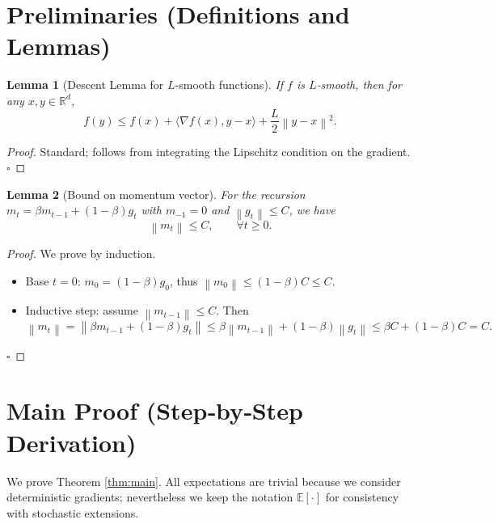 \documentclass{article}
\newtheorem{lemma}{Lemma}
\newcommand{\E}{\mathbb{E}}
\newcommand{\norm}[1]{\left\lVert #1 \right\rVert}
\begin{document}
\newpage
\section*{Preliminaries (Definitions and Lemmas)}
\begin{lemma}[Descent Lemma for $L$‑smooth functions]\label{lem:descent}
If $f$ is $L$‑smooth, then for any $x,y\in\mathbb{R}^d$,
\[
    f(y) \le f(x) + \langle\nabla f(x),y-x\rangle + \frac{L}{2}\norm{y-x}^2 .
\]
\end{lemma}
\begin{proof}
Standard; follows from integrating the Lipschitz condition on the gradient. \hfill $\square$
\end{proof}
\begin{lemma}[Bound on momentum vector]\label{lem:momentum}
For the recursion $m_t=\beta m_{t-1}+(1-\beta)g_t$ with $m_{-1}=0$ and $\norm{g_t}\le C$, we have
\[
    \norm{m_t}\le C,\qquad\forall t\ge0 .
\]
\end{lemma}
\begin{proof}
We prove by induction.
\begin{itemize}
    \item Base $t=0$: $m_0=(1-\beta)g_0$, thus $\norm{m_0}\le (1-\beta)C\le C$.
    \item Inductive step: assume $\norm{m_{t-1}}\le C$. Then
    \[
        \norm{m_t}= \norm{\beta m_{t-1}+(1-\beta)g_t}
        \le \beta\norm{m_{t-1}}+(1-\beta)\norm{g_t}
        \le \beta C+(1-\beta)C = C .
    \]
\end{itemize}
\hfill $\square$
\end{proof}

\newpage
\section*{Main Proof (Step‑by‑Step Derivation)}
We prove Theorem \ref{thm:main}.  All expectations are trivial because we consider deterministic gradients; nevertheless we keep the notation $\E[\cdot]$ for consistency with stochastic extensions.
\end{document}
